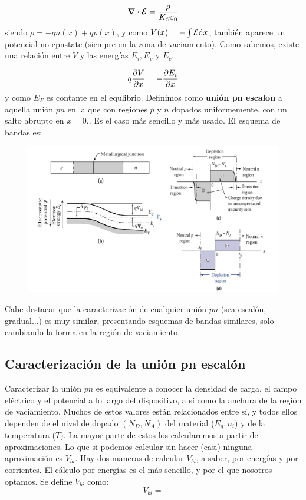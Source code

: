 \begin{equation}
    \div \boldsymbol{\mathcal{E}} = \frac{\rho}{K_S \varepsilon_0}
\end{equation}
siendo $\rho=-qn(x)+qp(x)$, y como $V(x)=-\int \mathcal{E} \mathrm{d} x$, también aparece un potencial no cpnstate (siempre en la zona de vaciamiento). Como sabemos, existe una relación entre $V$ y las energías $E_i,E_v$ y $E_c$. 

\begin{equation*}
    q \frac{\partial V}{\partial x} = - \frac{\partial E_i}{\partial x}
\end{equation*}
y como $E_F$ es contante en el equlibrio. Definimos como \textbf{unión pn escalon} a aquella unión $pn$ en la que con regiones $p$ y $n$ dopados uniformemente, con un salto abrupto en $x=0$.. Es el caso más sencillo y más usado. El esquema de bandas es:

\begin{figure}[h!] \centering
    \includegraphics[width=0.9\linewidth]{Cuerpo/Ch_03/03_Temario_01.png}
\end{figure}

Cabe destacar que la caracterización de cualquier unión $pn$ (sea escalón, gradual...) es muy similar, presentando esquemas de bandas similares, solo cambiando la forma en la región de vaciamiento.


\subsection{Caracterización de la unión pn escalón}
Caracterizar la unión $pn$ es equivalente a conocer la densidad de carga, el campo eléctrico y el potencial a lo largo del dispositivo, a sí como la anchura de la región de vaciamiento. Muchos de estos valores están relacionados entre sí, y todos ellos dependen de el nivel de dopado $(N_D,N_A)$ del material ($E_g,n_i$) y de la temperatura ($T$). La mayor parte de estos los calcularemos a partir de aproximaciones. Lo que si podemos calcular sin hacer (casi) ninguna aproximación es $V_{bi}$. Hay dos maneras de calcular $V_{bi}$, a saber, por energías y por corrientes. El cálculo por energías es el más sencillo, y por el que nosotros optamos. Se define $V_{bi}$ como:
\begin{equation}
    V_{bi} =  
\end{equation}

